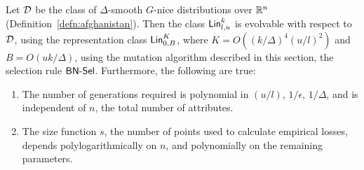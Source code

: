 \begin{theorem} Let ${\mathcal D}$ be the class of $\Delta$-smooth $G$-nice
distributions over $\mathbb{R}^n$ (Definition~\ref{defn:afghanistan}). Then the
class $\mathsf{Lin}^k_{l, u}$ is evolvable with respect to ${\mathcal D}$, using the
representation class $\mathsf{Lin}^K_{0, B}$, where $K = O((k/\Delta)^4 (u/l)^2)$ and $B
= O(uk/\Delta)$, using the mutation algorithm described in this section, the
selection rule $\mathsf{BN\mbox{-}Sel}$.  Furthermore, the following are true:
\begin{enumerate}
%
\item The number of generations required is polynomial in $(u/l)$, $1/\epsilon$,
$1/\Delta$, and is independent of $n$, the total number of attributes. 
%
\item The size function $s$, the number of points used to calculate empirical
losses, depends polylogarithmically on $n$, and
polynomially on the remaining parameters. 
%
\end{enumerate}
\label{thm:sparse_linear} \end{theorem}
